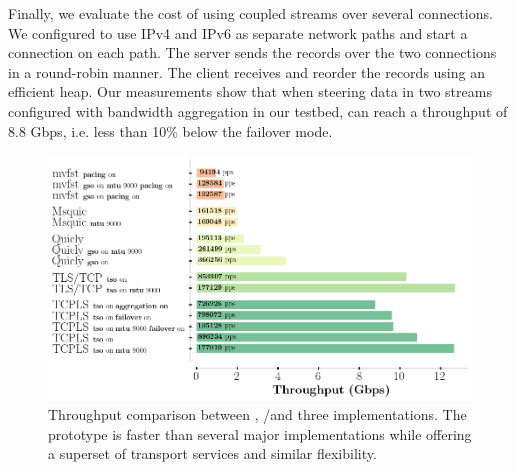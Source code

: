 Finally, we evaluate the cost of using coupled streams over several \tcp 
connections.
We configured \tcpls to use IPv4 and IPv6 as separate network paths and start a 
\tcp connection on each path. 
The \tcpls server sends the records over the two \tcp connections in a 
round-robin manner. The \tcpls client receives and reorder the records using an 
efficient heap.
Our measurements show that when steering data in two streams
configured with bandwidth aggregation in our testbed,
\tcpls can reach a throughput of 8.8 Gbps, i.e. less than 10\% below the
failover mode.

\begin{figure}[!t]
  \begin{center}
    \includegraphics[width=\columnwidth]{figures/perf_analysis.png}
  \end{center}
\vspace{-0.5cm}
  \caption{Throughput comparison between \tcpls, \tcp/\tls and three \quic 
  implementations.
    The
    \tcpls prototype is faster than several major \quic implementations while
    offering a superset of transport services and similar flexibility.}
  \label{fig:perf}
\end{figure}


